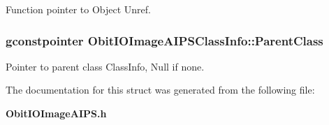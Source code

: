 Function pointer to Object Unref. 

\subsubsection{\setlength{\rightskip}{0pt plus 5cm}gconstpointer {\bf Obit\-IOImage\-AIPSClass\-Info::Parent\-Class}}\label{structObitIOImageAIPSClassInfo_o3}


Pointer to parent class Class\-Info, Null if none. 



The documentation for this struct was generated from the following file:\begin{CompactItemize}
\item 
{\bf Obit\-IOImage\-AIPS.h}\end{CompactItemize}
